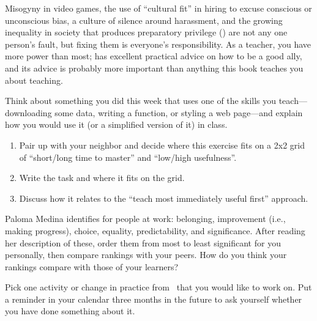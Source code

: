 Misogyny in video games,
the use of ``cultural fit'' in hiring to excuse conscious or unconscious bias,
a culture of silence around harassment,
and the growing inequality in society that produces preparatory privilege ()
are not any one person's fault,
but fixing them is everyone's responsibility.
As a teacher,
you have more power than most;
has excellent practical advice on how to be a good ally,
and its advice is probably more important than anything this book teaches you about teaching.



Think about something you did this week that uses one of the skills you teach---downloading some data,
writing a function,
or styling a web page---and
explain how you would use it (or a simplified version of it) in class.

\begin{enumerate}
\item
  Pair up with your neighbor and decide where this exercise fits
  on a 2x2 grid of ``short/long time to master'' and ``low/high usefulness''.
\item
  Write the task and where it fits on the grid.
\item
  Discuss how it relates to the ``teach most immediately useful first'' approach.
\end{enumerate}


Paloma Medina identifies  for people at work:
belonging,
improvement (i.e., making progress),
choice,
equality,
predictability,
and significance.
After reading her description of these,
order them from most to least significant for you personally,
then compare rankings with your peers.
How do you think your rankings compare with those of your learners?


Pick one activity or change in practice from~\cite{Lee2017} that you would like to work on.
Put a reminder in your calendar three months in the future
to ask yourself whether you have done something about it.


